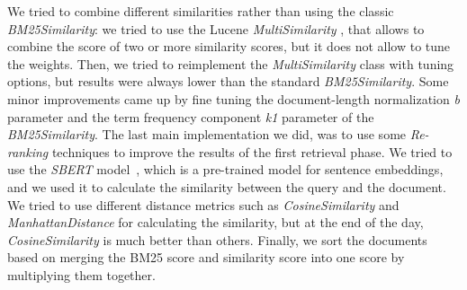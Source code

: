 We tried to combine different similarities rather than using the classic \textit{BM25Similarity}: we tried to use the Lucene \textit{MultiSimilarity} \cite{lucenemultisimilarity}, that allows to combine the score of two or more similarity scores, but it does not allow to
tune the weights. Then, we tried to reimplement the \textit{MultiSimilarity} class with tuning options, but results were always lower than the standard \textit{BM25Similarity}. Some minor improvements came up by fine tuning the document-length
normalization \textit{b} parameter and the term frequency component \textit{k1} parameter of the \textit{BM25Similarity}.
\newline
The last main implementation we did, was to use some \textit{Re-ranking} techniques to improve the results of the first retrieval phase.
We tried to use the \textit{SBERT} model~\cite{reimers-2019-sentence-bert}, which is a pre-trained model for sentence embeddings, and we used it to calculate the similarity between the query and the document.
We tried to use different distance metrics such as \textit{CosineSimilarity} and \textit{ManhattanDistance} for calculating the similarity, but at the end of the day, \textit{CosineSimilarity} is much better than others.
Finally, we sort the documents based on merging the BM25 score and similarity score into one score by multiplying them together.

